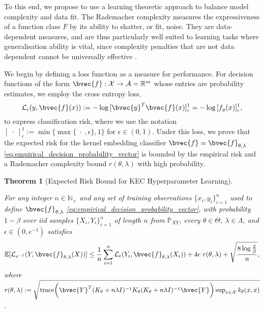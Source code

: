 \documentclass{article}
\newtheorem{theorem}{Theorem}[section]
\begin{document}
	To this end, we propose to use a learning theoretic approach to balance model complexity and data fit. The Rademacher complexity \citep{bartlett2002rademacher} measures the expressiveness of a function class $F$ by its ability to shatter, or fit, noise. They are data-dependent measures, and are thus particularly well suited to learning tasks where generalisation ability is vital, since complexity penalties that are not data dependent cannot be universally effective \citep{kearns1997experimental}. 
	
	We begin by defining a loss function as a measure for performance. For decision functions of the form $\bvec{f} : \mathcal{X} \to \mathcal{A} = \mathbb{R}^{m}$ whose entries are probability estimates, we employ the cross entropy loss,
	\begin{equation}
		\mathcal{L}_{\epsilon}(y, \bvec{f}(x)) := - \log{ [\bvec{y}^{T} \bvec{f}(x)]_{\epsilon}^{1} } = - \log{ [f_{y}(x)]_{\epsilon}^{1} },
	\label{eq:cross_entropy_loss_copy}
	\end{equation}
	to express classification risk, where we use the notation $[\;\cdot\;]_{\epsilon}^{1} := \min\{\max\{\;\cdot\;, \epsilon\}, 1\}$ for $\epsilon \in (0, 1)$. Under this loss, we prove that the expected risk for the kernel embedding classifier $\bvec{f} = \bvec{f}_{\theta, \lambda}$ \eqref{eq:empirical_decision_probability_vector} is bounded by the empirical risk and a Rademacher complexity bound $r(\theta, \lambda)$ with high probability.
	
	\begin{theorem}[Expected Risk Bound for KEC Hyperparameter Learning]
		\label{thm:expected_risk_bound_hyperparameter_learning_copy}
		
		For any integer $n \in \mathbb{N}_{+}$ and any set of training observations $\{x_{i}, y_{i}\}_{i = 1}^{n}$ used to define $\bvec{f}_{\theta, \lambda}$ \eqref{eq:empirical_decision_probability_vector}, with probability $1 - \beta$ over \textit{iid} samples $\{X_{i}, Y_{i}\}_{i = 1}^{n}$ of length $n$ from $\mathbb{P}_{X Y}$, every $\theta \in \Theta$, $\lambda \in \Lambda$, and $\epsilon \in (0, e^{-1})$ satisfies
		\begin{equation}
			\mathbb{E}[\mathcal{L}_{e^{-1}}(Y, \bvec{f}_{\theta, \lambda}(X))] \leq \frac{1}{n} \sum_{i = 1}^{n} \mathcal{L}_{\epsilon}(Y_{i}, \bvec{f}_{\theta, \lambda}(X_{i})) + 4 e \; r(\theta, \lambda) + \sqrt{\frac{8 \log{\frac{2}{\beta}}}{n}},
		\label{eq:expected_risk_bound_hyperparameter_learning_copy}
		\end{equation}
		where $r(\theta, \lambda) := \sqrt{\mathrm{trace}\bigg(\bvec{Y}^{T} (K_{\theta} + n \lambda I)^{-1} K_{\theta} (K_{\theta} + n \lambda I)^{-1} \bvec{Y}\bigg) \sup_{x \in \mathcal{X}} k_{\theta}(x, x)}$.
	\end{theorem}
	
\end{document}
